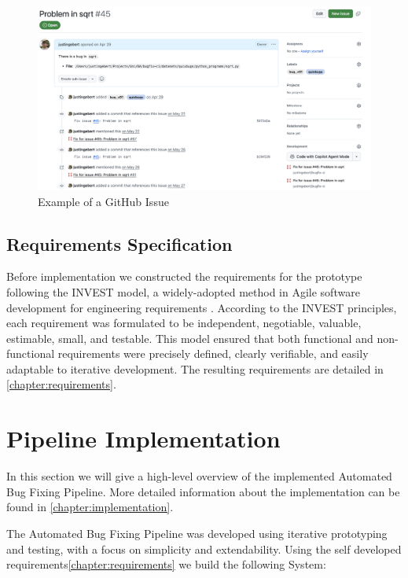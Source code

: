 \begin{figure}[H]
    \centering
    \includegraphics[width=1\textwidth]{images/github/GitHub Issue.png}
    \caption{Example of a GitHub Issue}
    \label{fig:gh-issue2}
\end{figure}

\subsection{Requirements Specification}

Before implementation we constructed the requirements for the prototype following the INVEST model, a widely-adopted method in Agile software development for engineering requirements \cite{10.5555/984017}. According to the INVEST principles, each requirement was formulated to be independent, negotiable, valuable, estimable, small, and testable. This model ensured that both functional and non-functional requirements were precisely defined, clearly verifiable, and easily adaptable to iterative development. The resulting requirements are detailed in \ref{chapter:requirements}.
\section{Pipeline Implementation}
In this section we will give a high-level overview of the implemented Automated Bug Fixing Pipeline. More detailed information about the implementation can be found in \ref{chapter:implementation}.

The Automated Bug Fixing Pipeline was developed using iterative prototyping and testing, with a focus on simplicity and extendability. Using the self developed requirements\ref{chapter:requirements} we build the following System:

